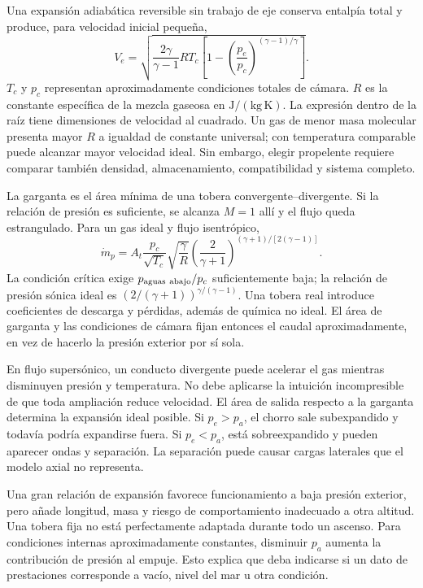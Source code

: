 Una expansión adiabática reversible sin trabajo de eje conserva entalpía total y produce, para velocidad inicial pequeña,
\begin{equation}
 V_e=\sqrt{\frac{2\gamma}{\gamma-1}RT_c
 \left[1-\left(\frac{p_e}{p_c}\right)^{(\gamma-1)/\gamma}\right]}.
\end{equation}
$T_c$ y $p_c$ representan aproximadamente condiciones totales de cámara. $R$ es la constante específica de la mezcla gaseosa en $\mathrm{J/(kg\,K)}$. La expresión dentro de la raíz tiene dimensiones de velocidad al cuadrado. Un gas de menor masa molecular presenta mayor $R$ a igualdad de constante universal; con temperatura comparable puede alcanzar mayor velocidad ideal. Sin embargo, elegir propelente requiere comparar también densidad, almacenamiento, compatibilidad y sistema completo.

La garganta es el área mínima de una tobera convergente--divergente. Si la relación de presión es suficiente, se alcanza $M=1$ allí y el flujo queda estrangulado. Para un gas ideal y flujo isentrópico,
\begin{equation}
 \dot m_p=A_t\frac{p_c}{\sqrt{T_c}}\sqrt{\frac{\gamma}{R}}
 \left(\frac{2}{\gamma+1}\right)^{(\gamma+1)/[2(\gamma-1)]}.
\end{equation}
La condición crítica exige $p_{\rm aguas\ abajo}/p_c$ suficientemente baja; la relación de presión sónica ideal es $(2/(\gamma+1))^{\gamma/(\gamma-1)}$. Una tobera real introduce coeficientes de descarga y pérdidas, además de química no ideal. El área de garganta y las condiciones de cámara fijan entonces el caudal aproximadamente, en vez de hacerlo la presión exterior por sí sola.

En flujo supersónico, un conducto divergente puede acelerar el gas mientras disminuyen presión y temperatura. No debe aplicarse la intuición incompresible de que toda ampliación reduce velocidad. El área de salida respecto a la garganta determina la expansión ideal posible. Si $p_e>p_a$, el chorro sale subexpandido y todavía podría expandirse fuera. Si $p_e<p_a$, está sobreexpandido y pueden aparecer ondas y separación. La separación puede causar cargas laterales que el modelo axial no representa.

Una gran relación de expansión favorece funcionamiento a baja presión exterior, pero añade longitud, masa y riesgo de comportamiento inadecuado a otra altitud. Una tobera fija no está perfectamente adaptada durante todo un ascenso. Para condiciones internas aproximadamente constantes, disminuir $p_a$ aumenta la contribución de presión al empuje. Esto explica que deba indicarse si un dato de prestaciones corresponde a vacío, nivel del mar u otra condición.

